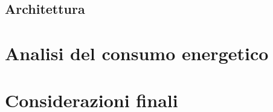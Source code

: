 \documentclass[a4paper]{article}
\begin{document}
\subsection{Architettura}




\section{Analisi del consumo energetico} %


\section{Considerazioni finali} %




\end{document}
